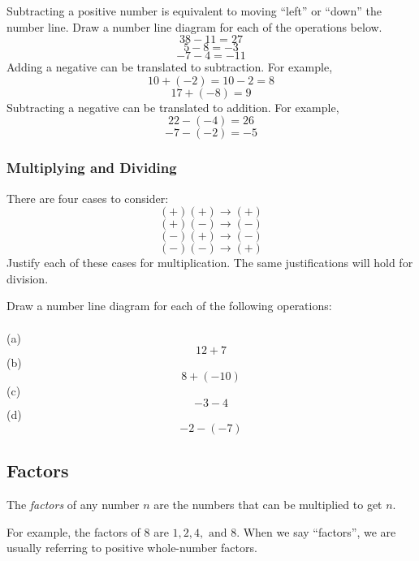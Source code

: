 Subtracting a positive number is equivalent to moving ``left'' or ``down'' the number line. 
Draw a number line diagram for each of the operations below. 
\[ 38 - 11 = 27 \]
\[  5-8 = -3  \]
\[  -7 - 4 = -11   \]
Adding a negative can be translated to subtraction.  For example, 
\[10 + (-2) = 10 -2 = 8 \]
\[  17 + (-8) = 9 \]
Subtracting a negative can be translated to addition.  For example, 
\[  22 - (-4) = 26 \]
\[ -7 - (-2) = -5 \]

\subsubsection{Multiplying and Dividing} 
There are four cases to consider: 
\[ (+)(+) \to (+)  \]
\[ (+)(-) \to (-)  \]
\[ (-)(+) \to (-)  \]
\[ (-)(-) \to (+)  \]
Justify each of these cases for multiplication.  The same justifications will hold for division.  

\newpage 

\begin{exercise}
	Draw a number line diagram for each of the following operations:   \\ \\
(a)	\[  12 + 7  \]    
(b)	\[  8 + (-10) \]  
(c)	\[  -3 - 4  \]
(d)	\[  -2 - (-7)    \]

\end{exercise}



\newpage 
\subsection{Factors}
\begin{definition}[Factor]
The \emph{factors} of any number \(n\) are the numbers that can be multiplied to get \(n\).  

For example, the factors of \(8\) are \(1, 2, 4, \text{ and } 8\). When we say ``factors'', we are usually referring to positive whole-number factors. 
\end{definition}

